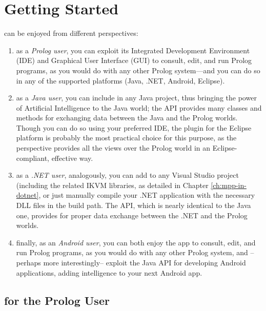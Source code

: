 \chapter{Getting Started}
\label{ch:getting-started}

\tuprolog{} can be enjoyed from different perspectives:
\begin{enumerate}
  \item as a \textit{Prolog user}, you can exploit its Integrated Development
        Environment (IDE) and Graphical User Interface (GUI) to consult, edit, and run Prolog programs, as you would do with any other Prolog system---and you can do so in any of the supported platforms (Java, .NET, Android, Eclipse).
  \item as a \textit{Java user}, you can include \tuprolog{} in any Java project,
        thus bringing the power of Artificial Intelligence to the Java world; the \tuprolog{} API provides many classes and methods for exchanging data
        between the Java and the Prolog worlds.
        Though you can do so using your preferred IDE, the \tuprolog{} plugin
        for the Eclipse platform is probably the most practical choice for this purpose, as the \tuprolog{} perspective provides all the views over the Prolog world in an Eclipse-compliant, effective way.
  \item as a \textit{.NET user}, analogously, you can add \tuprolog{} to any
        Visual Studio project (including the related IKVM libraries, as detailed in Chapter \ref{ch:mpp-in-dotnet}, or just manually compile your .NET application with the necessary DLL files in the build path. The \tuprolog{} API, which is nearly identical to the Java one, provides for proper data exchange
        between the .NET and the Prolog worlds.
  \item finally, as an \textit{Android user}, you can both enjoy the \tuprolog{} app
        to consult, edit, and run Prolog programs, as you would do with any other Prolog system, and --perhaps more interestingly-- exploit the \tuprolog{} Java API for developing Android applications, adding intelligence to your next Android app.
\end{enumerate}

\section{\tuprolog{} for the Prolog User}
\label{sec:prolog-user-perspective}

